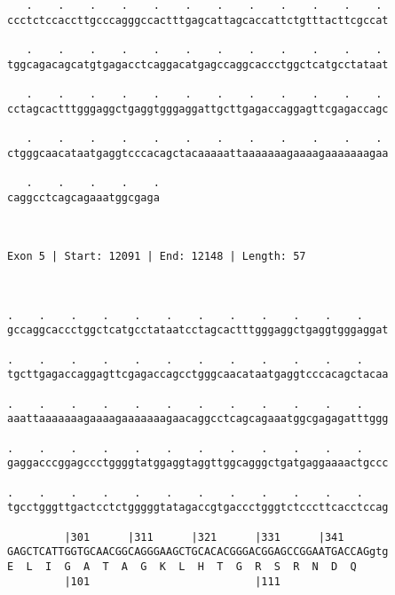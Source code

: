 \documentclass{article}
\begin{document}
\begin{Verbatim}
   .    .    .    .    .    .    .    .    .    .    .    . 
ccctctccaccttgcccagggccactttgagcattagcaccattctgtttacttcgccat
                                                            
   .    .    .    .    .    .    .    .    .    .    .    . 
tggcagacagcatgtgagacctcaggacatgagccaggcaccctggctcatgcctataat
                                                            
   .    .    .    .    .    .    .    .    .    .    .    . 
cctagcactttgggaggctgaggtgggaggattgcttgagaccaggagttcgagaccagc
                                                            
   .    .    .    .    .    .    .    .    .    .    .    . 
ctgggcaacataatgaggtcccacagctacaaaaattaaaaaaagaaaagaaaaaaagaa
                                                            
   .    .    .    .    .
caggcctcagcagaaatggcgaga
                        
                        
 
Exon 5 | Start: 12091 | End: 12148 | Length: 57



.    .    .    .    .    .    .    .    .    .    .    .    
gccaggcaccctggctcatgcctataatcctagcactttgggaggctgaggtgggaggat
                                                            
.    .    .    .    .    .    .    .    .    .    .    .    
tgcttgagaccaggagttcgagaccagcctgggcaacataatgaggtcccacagctacaa
                                                            
.    .    .    .    .    .    .    .    .    .    .    .    
aaattaaaaaaagaaaagaaaaaaagaacaggcctcagcagaaatggcgagagatttggg
                                                            
.    .    .    .    .    .    .    .    .    .    .    .    
gaggacccggagccctggggtatggaggtaggttggcagggctgatgaggaaaactgccc
                                                            
.    .    .    .    .    .    .    .    .    .    .    .    
tgcctgggttgactcctctgggggtatagaccgtgaccctgggtctcccttcacctccag
                                                            
         |301      |311      |321      |331      |341       
GAGCTCATTGGTGCAACGGCAGGGAAGCTGCACACGGGACGGAGCCGGAATGACCAGgtg
E  L  I  G  A  T  A  G  K  L  H  T  G  R  S  R  N  D  Q     
         |101                          |111                 
  

\end{Verbatim}
\end{document}
